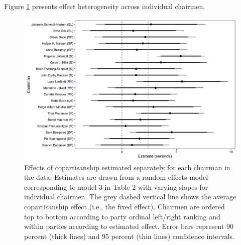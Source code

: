 \documentclass[12pt,a4paper]{article}
\begin{document}
Figure \ref{parlbias_chairranfefs} presents effect heterogeneity across individual chairmen.

\begin{figure}[!h]
\centering
\includegraphics[scale=.55]{../figures/parlbias_chairranefs.png}
  \caption{Effects of copartisanship estimated separately for each chairman in the data. Estimates are drawn from a random effects model corresponding to model 3 in Table 2 with varying slopes for individual chairmen. The grey dashed vertical line shows the average copartisanship effect (i.e., the fixed effect). Chairmen are ordered top to bottom according to party ordinal left/right ranking and within parties according to estimated effect. Error bars represent 90 percent (thick lines) and 95 percent (thin lines) confidence intervals.}\label{parlbias_chairranfefs}
\end{figure}
\end{document}
